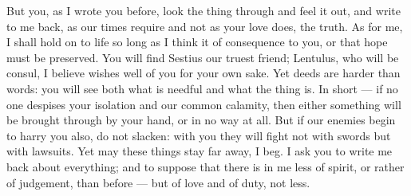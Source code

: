  But you, as I wrote you before, look the thing through and feel it out, and write to me back, as our times require and not as your love does, the truth. As for me, I shall hold on to life so long as I think it of consequence to you, or that hope must be preserved. You will find Sestius our truest friend; Lentulus, who will be consul, I believe wishes well of you for your own sake. Yet deeds are harder than words: you will see both what is needful and what the thing is. In short --- if no one despises your isolation and our common calamity, then either something will be brought through by your hand, or in no way at all. But if our enemies begin to harry you also, do not slacken: with you they will fight not with swords but with lawsuits. Yet may these things stay far away, I beg. I ask you to write me back about everything; and to suppose that there is in me less of spirit, or rather of judgement, than before --- but of love and of duty, not less.
